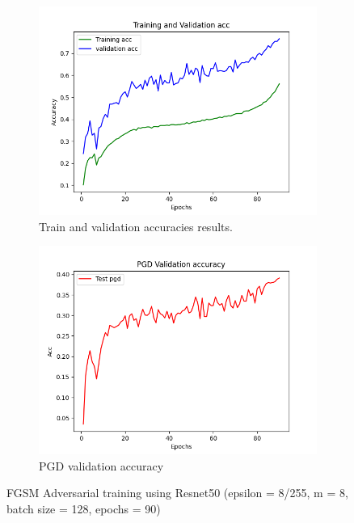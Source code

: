 \documentclass{article}
\begin{document}
\begin{figure}[hbt!]
  \centering
  \begin{subfigure}[b]{0.4\linewidth}
    \includegraphics[width=\linewidth]{images/FastResnet/Figure_2.png}
    \caption{ Train and validation accuracies results.}
  \end{subfigure}
  \begin{subfigure}[b]{0.4\linewidth}
    \includegraphics[width=\linewidth]{images/FastResnet/Figure_5.png}
    \caption{PGD validation accuracy}
  \end{subfigure}
  \caption{FGSM Adversarial training using Resnet50 (epsilon = 8/255, m = 8, batch size = 128, epochs = 90)}
  \label{fig:coffee}
\end{figure}
\newpage
\end{document}
